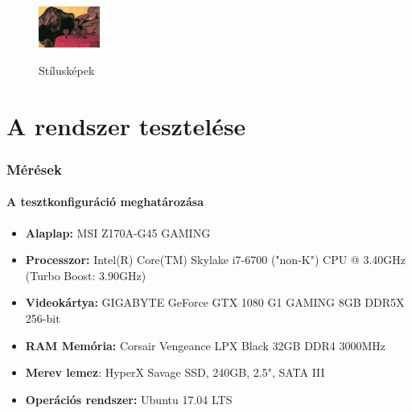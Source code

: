 \documentclass{beamer}
\begin{document}
\begin{frame}
\begin{figure}[!htbp]
{				\includegraphics[width=20mm]{stylistic/styles/ripl_ronai_jozsef_apam_es_piacsek_bacsi_vorosbor_mellett.jpg}
			}
			\caption{Stílusképek}
			\label{styles}
		\end{figure}
	\end{frame}

	\section{A rendszer tesztelése}
	
	\begin{frame}
		\frametitle{Mérések}
		\framesubtitle{A tesztkonfiguráció meghatározása}
		
		\begin{itemize}
			\item \textbf{Alaplap:} MSI Z170A-G45 GAMING
			\item \textbf{Processzor:} Intel(R) Core(TM) Skylake i7-6700 ("non-K") CPU @ 3.40GHz (Turbo Boost: 3.90GHz)
			\item \textbf{Videokártya:} GIGABYTE GeForce GTX 1080 G1 GAMING 8GB DDR5X 256-bit
			\item \textbf{RAM Memória:} Corsair Vengeance LPX Black 32GB DDR4 3000MHz
			\item \textbf{Merev lemez}: HyperX Savage SSD, 240GB, 2.5", SATA III
			\item \textbf{Operációs rendszer:} Ubuntu 17.04 LTS
		\end{itemize}
	\end{frame}
\end{document}
